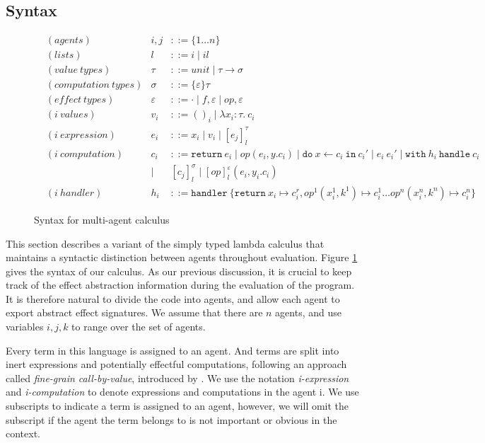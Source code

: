 \subsection{Syntax}
\begin{figure}
\label{fig-syntax}
\begin{align*}
&(agents) &i, j &::= \{1 \dots n\}\\
&(lists) & l &::= i \mid il\\
&(value\ types) &\tau &::= unit \mid \tau \rightarrow \sigma\\
&(computation\ types) &\sigma &::= \{\varepsilon\}\tau\\
&(effect\ types) &\varepsilon &::= \cdot \mid f, \varepsilon \mid op, \varepsilon\\
&(i\  values) &{v_i} &::= ()_i \mid \lambda x_i:\tau.\ c_i\\
&(i\ expression) &e_i &::= x_i \mid v_i \mid [e_j]^\tau_l \\
&(i\ computation) &c_i &::= \texttt{return}\ e_i \mid op(e_i, y.c_i) \mid \texttt{do}\ x \leftarrow c_i\ \texttt{in}\ c_i' \mid e_i\ e_i' \mid \texttt{with}\ h_i\ \texttt{handle}\ c_i\\
 &\ &\mid\ &[c_j]^\sigma_l \mid [op]^\varepsilon_l (e_i, y_i.c_i)\\
&(i\ handler) &h_i &::= \texttt{handler}\ \{\texttt{return}\ x_i \mapsto c^r_i, op^1(x_i^1, k^1) \mapsto c_i^1 \dots  op^n(x_i^n, k^n) \mapsto c_i^n\}  
\end{align*}
\caption{Syntax for multi-agent calculus}
\end{figure}

This section describes a variant of the simply typed lambda calculus that maintains a syntactic distinction between agents throughout evaluation. Figure \ref{fig-syntax} gives the syntax of our calculus. As our previous discussion, it is crucial to keep track of the effect abstraction information during the evaluation of the program. It is therefore natural to divide the code into agents, and allow each agent to export abstract effect signatures. We assume that there are $n$ agents, and use variables $i, j, k$ to range over the set of agents. 

Every term in this language is assigned to an agent. And terms are split into inert expressions and potentially effectful computations, following an approach called \emph{fine-grain call-by-value}, introduced by \citet{levy03}. We use the notation \emph{i-expression} and \emph{i-computation} to denote expressions and computations in the agent i. We use subscripts to indicate a term is assigned to an agent, however, we will omit the subscript if the agent the term belongs to is not important or obvious in the context.

